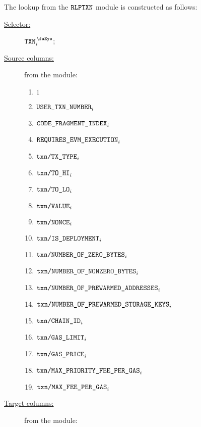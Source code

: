 The lookup from the $\texttt{RLPTXN}$ module is constructed as follows:
\begin{description}
	\item[\underline{Selector:}] $\isTxn _{i}$;
	\item[\underline{Source columns:}] from the \rlpTxnMod{} module:
		\begin{multicols}{3}
			\begin{enumerate}
				\item $1$
				\item $\texttt{USER}\texttt{\_}\texttt{TXN\_NUMBER}                       _{i}$
				\item $\texttt{CODE\_FRAGMENT\_INDEX}                                         _{i}$
				\item $\texttt{REQUIRES\_EVM\_EXECUTION}      _{i}$
				\item $\texttt{txn}\texttt{/}\texttt{{TX\_TYPE}}               _{i}$
				\item $\texttt{txn}\texttt{/}\texttt{{TO\_HI}}                 _{i}$
				\item $\texttt{txn}\texttt{/}\texttt{{TO\_LO}}                 _{i}$
				\item $\texttt{txn}\texttt{/}\texttt{{VALUE}}             _{i}$
				\item $\texttt{txn}\texttt{/}\texttt{{\texttt{NONCE}}}                _{i}$
				\item $\texttt{txn}\texttt{/}\texttt{{IS\_DEPLOYMENT}}                _{i}$
				\item $\texttt{txn}\texttt{/}\texttt{{NUMBER\_OF\_ZERO\_BYTES}}         _{i}$
				\item $\texttt{txn}\texttt{/}\texttt{{NUMBER\_OF\_NONZERO\_BYTES}}      _{i}$
				\item $\texttt{txn}\texttt{/}\texttt{{NUMBER\_OF\_PREWARMED\_ADDRESSES}}      _{i}$
				\item $\texttt{txn}\texttt{/}\texttt{{NUMBER\_OF\_PREWARMED\_STORAGE\_KEYS}}   _{i}$
				\item $\texttt{txn}\texttt{/}\texttt{{CHAIN\_ID}}              _{i}$
				\item $\texttt{txn}\texttt{/}\texttt{{GAS\_LIMIT}}             _{i}$
				\item $\texttt{txn}\texttt{/}\texttt{{GAS\_PRICE}}             _{i}$
				\item $\texttt{txn}\texttt{/}\texttt{{MAX\_PRIORITY\_FEE\_PER\_GAS}} _{i}$
				\item $\texttt{txn}\texttt{/}\texttt{{MAX\_FEE\_PER\_GAS}}         _{i}$
			\end{enumerate}
		\end{multicols}
	\item[\underline{Target columns:}] from the \userTxnDataMod{} module: 
		\begin{multicols}{2}

\end{multicols}
\end{description}
